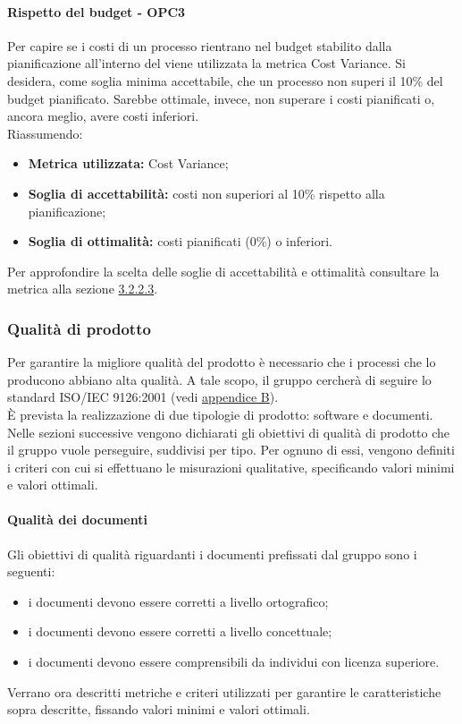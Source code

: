\documentclass[PianoDiQualifica.tex]{subfiles}
\begin{document}
			\paragraph{Rispetto del budget - OPC3}
			Per capire se i costi di un processo rientrano nel budget stabilito dalla pianificazione all'interno del \PPdocRR{} viene utilizzata la metrica Cost Variance.
			Si desidera, come soglia minima accettabile, che un processo non superi il 10\% del budget pianificato. Sarebbe ottimale, invece, non superare i costi pianificati o, ancora meglio, avere costi inferiori.\\
			Riassumendo:
			\begin{itemize}
			\item \textbf{Metrica utilizzata:} Cost Variance;
			\item \textbf{Soglia di accettabilità:} costi non superiori al 10\% rispetto alla pianificazione;
			\item \textbf{Soglia di ottimalità:}  costi pianificati (0\%) o inferiori.
			\end{itemize}
			Per approfondire la scelta delle soglie di accettabilità e ottimalità consultare la metrica alla sezione \hyperlink{Cost_m}{3.2.2.3}.

		\subsubsection{Qualità di prodotto}
		Per garantire la migliore qualità del prodotto è necessario che i processi che lo producono abbiano alta qualità.
		A tale scopo, il gruppo \GRUPPO{} cercherà di seguire lo standard ISO/IEC 9126:2001 (vedi \hyperlink{ISOIEC}{appendice B}). \\
		È prevista la realizzazione di due tipologie di prodotto: software e documenti.
		Nelle sezioni successive vengono dichiarati gli obiettivi di qualità di prodotto che il gruppo vuole perseguire, suddivisi per tipo.
		Per ognuno di essi, vengono definiti i criteri con cui si effettuano le misurazioni qualitative, specificando valori minimi e valori ottimali.

			\paragraph{Qualità dei documenti}
			Gli obiettivi di qualità riguardanti i documenti prefissati dal gruppo \GRUPPO{} sono i seguenti:
			\begin{itemize}
				\item i documenti devono essere corretti a livello ortografico;
				\item i documenti devono essere corretti a livello concettuale;
				\item i documenti devono essere comprensibili da individui con licenza superiore.
			\end{itemize}
			Verrano ora descritti metriche e criteri utilizzati per garantire le caratteristiche sopra descritte, fissando valori minimi e valori ottimali.
\end{document}
